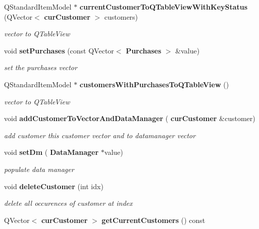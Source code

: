 \begin{DoxyCompactItemize}
\mbox{\label{classadmin_tools_aeb25d8f7db9a40659c95d1c341ff67a3}} 
Q\+Standard\+Item\+Model $\ast$ \textbf{ current\+Customer\+To\+Q\+Table\+View\+With\+Key\+Status} (Q\+Vector$<$ \textbf{ cur\+Customer} $>$ customers)
\begin{DoxyCompactList}\small\item\em vector to Q\+Table\+View \end{DoxyCompactList}\item 
\mbox{\label{classadmin_tools_abc9cb22e89b21c8e5a119db3a9f00898}} 
void \textbf{ set\+Purchases} (const Q\+Vector$<$ \textbf{ Purchases} $>$ \&value)
\begin{DoxyCompactList}\small\item\em set the purchases vector \end{DoxyCompactList}\item 
\mbox{\label{classadmin_tools_a0cfe12c3a867b17965a994f960aedb4f}} 
Q\+Standard\+Item\+Model $\ast$ \textbf{ customers\+With\+Purchases\+To\+Q\+Table\+View} ()
\begin{DoxyCompactList}\small\item\em vector to Q\+Table\+View \end{DoxyCompactList}\item 
\mbox{\label{classadmin_tools_aa1c96bee98621890ebbbf2d6390e5d9c}} 
void \textbf{ add\+Customer\+To\+Vector\+And\+Data\+Manager} (\textbf{ cur\+Customer} \&customer)
\begin{DoxyCompactList}\small\item\em add customer this customer vector and to datamanager vector \end{DoxyCompactList}\item 
\mbox{\label{classadmin_tools_ac27e5b1c1f4a9a91d95c7baf8310e6df}} 
void \textbf{ set\+Dm} (\textbf{ Data\+Manager} $\ast$value)
\begin{DoxyCompactList}\small\item\em populate data manager \end{DoxyCompactList}\item 
\mbox{\label{classadmin_tools_a6b55e9a8434a400c89340373d03f0a28}} 
void \textbf{ delete\+Customer} (int idx)
\begin{DoxyCompactList}\small\item\em delete all occurences of customer at index \end{DoxyCompactList}\item 
\mbox{\label{classadmin_tools_a05b2fcdc378afaf55d154c9765627d87}} 
Q\+Vector$<$ \textbf{ cur\+Customer} $>$ \textbf{ get\+Current\+Customers} () const

\end{DoxyCompactItemize}
